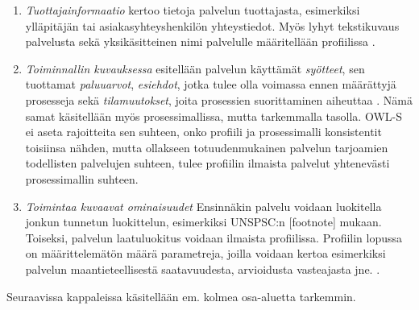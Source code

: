 \documentclass[finnish]{tktltiki2}
\theoremstyle{definition}
\theoremstyle{remark}
\begin{document}
\begin{enumerate}
 \item \textit{Tuottajainformaatio} kertoo tietoja palvelun tuottajasta, esimerkiksi ylläpitäjän tai asiakasyhteyshenkilön yhteystiedot. Myös lyhyt tekstikuvaus palvelusta sekä yksikäsitteinen nimi palvelulle määritellään profiilissa\cite{OWLS} .
 
 \item \textit{Toiminnallin kuvauksessa} esitellään palvelun käyttämät \textit{syötteet}, sen tuottamat \textit{paluuarvot}, \textit{esiehdot}, jotka tulee olla voimassa ennen määrättyjä
 prosesseja sekä \textit{tilamuutokset}, joita prosessien suorittaminen aiheuttaa \cite{OWLS}. Nämä samat käsitellään myös prosessimallissa, mutta tarkemmalla tasolla. OWL-S ei aseta
 rajoitteita sen suhteen, onko profiili ja prosessimalli konsistentit toisiinsa nähden, mutta ollakseen totuudenmukainen palvelun tarjoamien todellisten palvelujen suhteen, tulee profiilin ilmaista
 palvelut yhtenevästi prosessimallin suhteen. 
 
 \item \textit{Toimintaa kuvaavat ominaisuudet} Ensinnäkin palvelu voidaan luokitella jonkun tunnetun luokittelun, esimerkiksi UNSPSC:n [footnote] mukaan. Toiseksi, palvelun laatuluokitus voidaan 
 ilmaista profiilissa. Profiilin lopussa on määrittelemätön määrä parametreja, joilla voidaan kertoa esimerkiksi palvelun maantieteellisestä saatavuudesta, arvioidusta vasteajasta jne. \cite{OWLS}.
\end{enumerate}

Seuraavissa kappaleissa käsitellään em. kolmea osa-aluetta tarkemmin. 


% 
% 
% 
% 
\end{document}
